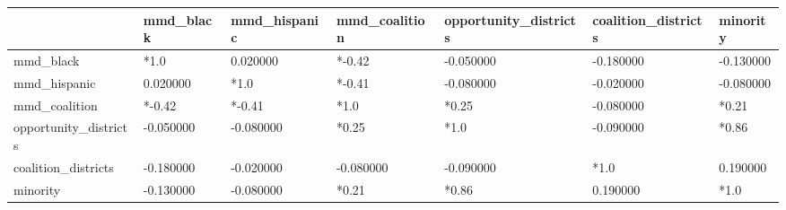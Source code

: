 \begin{tabular}{lllllll}
\toprule
 & mmd_black & mmd_hispanic & mmd_coalition & opportunity_districts & coalition_districts & minority \\
\midrule
mmd_black & *1.0 & 0.020000 & *-0.42 & -0.050000 & -0.180000 & -0.130000 \\
mmd_hispanic & 0.020000 & *1.0 & *-0.41 & -0.080000 & -0.020000 & -0.080000 \\
mmd_coalition & *-0.42 & *-0.41 & *1.0 & *0.25 & -0.080000 & *0.21 \\
opportunity_districts & -0.050000 & -0.080000 & *0.25 & *1.0 & -0.090000 & *0.86 \\
coalition_districts & -0.180000 & -0.020000 & -0.080000 & -0.090000 & *1.0 & 0.190000 \\
minority & -0.130000 & -0.080000 & *0.21 & *0.86 & 0.190000 & *1.0 \\
\bottomrule
\end{tabular}
